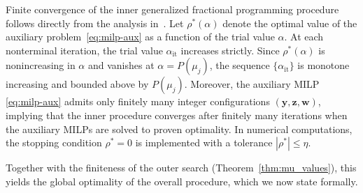 \documentclass[a4paper,11pt,reqno]{amsart}
\begin{document}
Finite convergence of the inner generalized fractional programming procedure
follows directly from the analysis in~\cite{gonzalez2024maf}. Let $\rho^*(\alpha)$ denote the optimal
value of the auxiliary problem~\eqref{eq:milp-aux} as a function of the trial
value $\alpha$. At each nonterminal iteration, the trial value
$\alpha_{\mathrm{it}}$ increases strictly. Since $\rho^*(\alpha)$ is
nonincreasing in $\alpha$ and vanishes at $\alpha=P(\mu_j)$, the sequence
$\{\alpha_{\mathrm{it}}\}$ is monotone increasing and bounded above by
$P(\mu_j)$. Moreover, the auxiliary MILP
\eqref{eq:milp-aux} admits only finitely many integer configurations
$(\mathbf y,\mathbf z,\mathbf w)$, implying that the inner procedure converges
after finitely many iterations when the auxiliary MILPs are solved to proven
optimality. In numerical computations, the stopping condition
$\rho^*=0$ is implemented with a tolerance $|\rho^*|\le\eta$.

Together with the finiteness of the outer search
(Theorem~\ref{thm:mu_values}), this yields the global optimality of the overall
procedure, which we now state formally.
\end{document}
